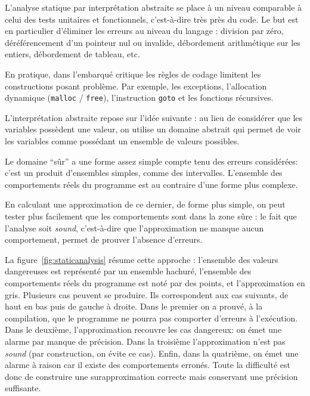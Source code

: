 L'analyse statique par interprétation abstraite se place à un niveau comparable
à celui des tests unitaires et fonctionnels, c'est-à-dire très près du code. Le
but est en particulier d'éliminer les erreurs au niveau du langage : division
par zéro, déréférencement d'un pointeur nul ou invalide, débordement
arithmétique sur les entiers, débordement de tableau, etc.


En pratique, dans l'embarqué critique les règles de codage limitent les
constructions posant problème. Par exemple, les exceptions, l'allocation
dynamique (\texttt{malloc} / \texttt{free}), l'instruction \texttt{goto} et les
fonctions récursives.

L'interprétation abstraite repose sur l'idée suivante : au lieu de considérer
que les variables possèdent une valeur, on utilise un domaine abstrait qui
permet de voir les variables comme possédant un ensemble de valeurs possibles.

Le domaine \enquote{sûr} a une forme assez simple compte tenu des erreurs
considérées: c'est un produit d'ensembles simples, comme des intervalles.
L'ensemble des comportements réels du programme est au contraire d'une forme
plus complexe.


En calculant une approximation de ce dernier, de forme plus simple, on peut
tester plus facilement que les comportements sont dans la zone sûre : le fait
que l'analyse soit \emph{sound}, c'est-à-dire que l'approximation ne manque
aucun comportement, permet de prouver l'absence d'erreurs.

La figure~\ref{fig:staticanalysis} résume cette approche : l'ensemble des
valeurs dangereuses est représenté par un ensemble hachuré, l'ensemble des
comportements réels du programme est noté par des points, et l'approximation en
gris. Plusieurs cas peuvent se produire. Ils correspondent aux cas suivants, de
haut en bas puis de gauche à droite. Dans le premier on a prouvé, à la
compilation, que le programme ne pourra pas comporter d'erreurs à l'exécution.
Dans le deuxième, l'approximation recouvre les cas dangereux: on émet une alarme
par manque de précision. Dans la troisième l'approximation n'est pas
\emph{sound} (par construction, on évite ce cas). Enfin, dans la quatrième, on
émet une alarme à raison car il existe des comportements erronés. Toute la
difficulté est donc de construire une surapproximation correcte mais conservant
une précision suffisante.

